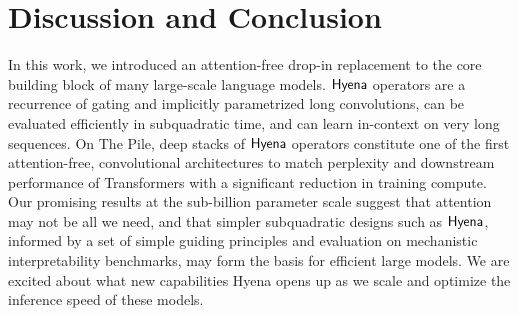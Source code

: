 %
\section{Discussion and Conclusion}
%
In this work, we introduced an attention-free drop-in replacement to the core building block of many large-scale language models. ${\sf Hyena}$ operators are a recurrence of gating and implicitly parametrized long convolutions, can be evaluated efficiently in subquadratic time, and can learn in-context on very long sequences. 
%
On {\sc The Pile}, deep stacks of ${\sf Hyena}$ operators constitute one of the first attention-free, convolutional architectures to match perplexity and downstream performance of Transformers with a significant reduction in training compute. 
%
Our promising results at the sub-billion parameter scale suggest that attention may not be all we need, and that simpler subquadratic designs such as ${\sf Hyena}$, informed by a set of simple guiding principles and evaluation on mechanistic interpretability benchmarks, may form the basis for efficient large models. We are excited about what new capabilities {\sf Hyena} opens up as we scale and optimize the inference speed of these models.